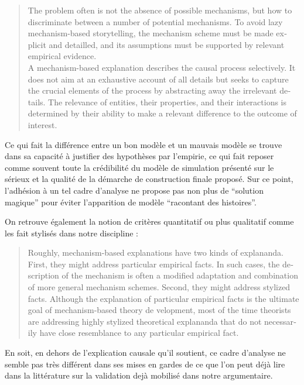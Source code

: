 \foreignblockquote{english}[\cite{Hedstrom2010}]{The problem often is not the absence of possible mechanisms, but how to discriminate between a number of potential mechanisms. To avoid lazy mechanism-based storytelling, the mechanism scheme must be made explicit and detailled, and its assumptions must be supported by relevant empirical evidence.\\
A mechanism-based explanation describes the causal process selectively. It does not aim at an exhaustive account of all details but seeks to capture the crucial elements of the process by abstracting away the irrelevant details. The relevance of entities, their properties, and their interactions is determined by their ability to make a relevant difference to the outcome of interest.}

Ce qui fait la différence entre un bon modèle et un mauvais modèle se trouve dans sa capacité à justifier des hypothèses par l'empirie, ce qui fait reposer comme souvent toute la crédibilité du modèle de simulation présenté sur le sérieux et la qualité de la démarche de construction finale proposé. Sur ce point, l'adhésion à un tel cadre d'analyse ne propose pas non plus de \enquote{solution magique} pour éviter l'apparition de modèle \enquote{racontant des histoires}.

On retrouve également la notion de critères quantitatif ou plus qualitatif comme les fait stylisés dans notre discipline : 

\foreignblockquote{english}[\cite{Hedstrom2010}]{Roughly, mechanism-based explanations have two kinds of explananda. First, they might address particular empirical facts. In such cases, the description of the mechanism is often a modified adaptation and combination of more general mechanism schemes. Second, they might address stylized facts. Although the explanation of particular empirical facts is the ultimate goal of mechanism-based theory de velopment, most of the time theorists are addressing highly stylized theoretical explananda that do not necessarily have close resemblance to any particular empirical fact. }

En soit, en dehors de l'explication causale qu'il soutient, ce cadre d'analyse ne semble pas très différent dans ses mises en gardes de ce que l'on peut déjà lire dans la littérature sur la validation dejà mobilisé dans notre argumentaire. %

